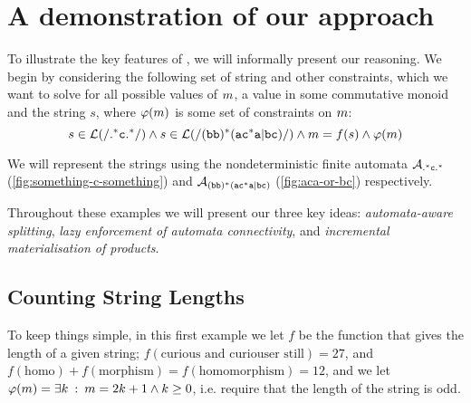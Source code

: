 \documentclass[acmsmall,review,anonymous,screen]{acmart}\settopmatter{printfolios=true,printccs=true,printacmref=true}
\theoremstyle{definition}
\begin{document}
\section{A demonstration of our approach}\label{sec:motivation}

To illustrate the key features of \Calculus, we will informally present our
reasoning. We begin by considering the following set of string and other
constraints, which we want to solve for all possible values of $m$,
a value in some commutative monoid and the string $s$, where
$\varphi(m)$ is some set of constraints on $m$:
\[
   s \in \operatorname{\mathcal{L}}(\mathtt{/}\mathtt{.^\ast{}c.^\ast}{}\mathtt{/})  \land
   s \in \operatorname{\mathcal{L}}(\mathtt{/}\mathtt{(bb)^\ast(ac^\ast{}a|bc)}{}\mathtt{/})  \land
   m = f(s)  \land
   \varphi(m)
\]

We will represent the strings using the nondeterministic finite automata
 $\mathcal{A}_{\mathtt{.^\ast{}c.^\ast}}{}$ (\cref{fig:something-c-something}) and $\mathcal{A}_{\mathtt{(bb)^\ast(ac^\ast{}a|bc)}}{}$
 (\cref{fig:aca-or-bc}) respectively.

 Throughout these examples we will present our three key ideas:
 \emph{automata-aware splitting}, \emph{lazy enforcement of automata
 connectivity}, and \emph{incremental materialisation of products}.
 
\subsection{Counting String Lengths}

To keep things simple, in this first example we let $f$ be the function that
gives the length of a given string; $f\left(\text{curious and curiouser
still}\right) = 27$, and $f\left(\text{homo}\right) +
f\left(\text{morphism}\right) = f\left(\text{homomorphism}\right) = 12$, and we
let $\varphi(m) = \exists k \::\: m = 2k + 1 \land k \geq 0$,
i.e. require that the length of the string is odd.
\end{document}
